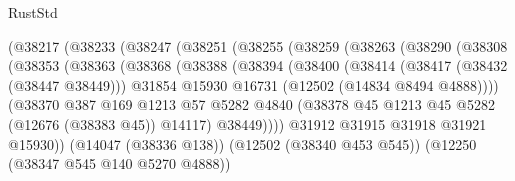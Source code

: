 \begin{lexlean}{RustStd}
\begin{coremodule}
                          (@38217
                            (@38233
                              (@38247
                                (@38251
                                  (@38255
                                    (@38259
                                      (@38263
                                        (@38290
                                          (@38308
                                            (@38353
                                              (@38363
                                                (@38368
                                                  (@38388
                                                    (@38394
                                                      (@38400
                                                        (@38414
                                                          (@38417 (@38432 (@38447 @38449)))
                                                          @31854
                                                          @15930
                                                          @16731
                                                          (@12502 (@14834 @8494 @4888))))
                                                      (@38370
                                                        @387
                                                        @169
                                                        @1213
                                                        @57
                                                        @5282
                                                        @4840
                                                        (@38378
                                                          @45
                                                          @1213
                                                          @45
                                                          @5282
                                                          (@12676 (@38383 @45))
                                                          @14117)
                                                        @38449))))
                                                @31912
                                                @31915
                                                @31918
                                                @31921
                                                @15930))
                                            (@14047 (@38336 @138))
                                            (@12502 (@38340 @453 @545))
                                            (@12250 (@38347 @545 @140 @5270 @4888))

\end{coremodule}
\end{lexlean}
